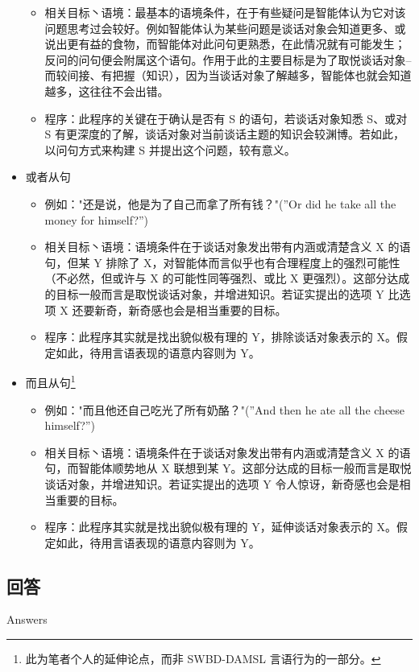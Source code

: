 \begin{itemize}
\begin{itemize}
\item 相关目标丶语境：最基本的语境条件，在于有些疑问是智能体认为它对该问题思考过会较好。例如智能体认为某些问题是谈话对象会知道更多、或说出更有益的食物，而智能体对此问句更熟悉，在此情况就有可能发生；反问的问句便会附属这个语句。作用于此的主要目标是为了取悦谈话对象– 而较间接、有把握（知识），因为当谈话对象了解越多，智能体也就会知道越多，这往往不会出错。 
\item 程序：此程序的关键在于确认是否有 S 的语句，若谈话对象知悉 S、或对 S 有更深度的了解，谈话对象对当前谈话主题的知识会较渊博。若如此，以问句方式来构建 S 并提出这个问题，较有意义。
\end{itemize}
\item 或者从句
\begin{itemize}
\item 例如："还是说，他是为了自己而拿了所有钱？"(”Or did he take all the money for himself?”)
\item 相关目标丶语境：语境条件在于谈话对象发出带有内涵或清楚含义 X 的语句，但某 Y 排除了 X，对智能体而言似乎也有合理程度上的强烈可能性（不必然，但或许与 X 的可能性同等强烈、或比 X 更强烈）。这部分达成的目标一般而言是取悦谈话对象，并增进知识。若证实提出的选项 Y 比选项 X 还要新奇，新奇感也会是相当重要的目标。 
\item 程序：此程序其实就是找出貌似极有理的 Y，排除谈话对象表示的 X。假定如此，待用言语表现的语意内容则为 Y。
\end{itemize}
\item 而且从句\footnote{此为笔者个人的延伸论点，而非 SWBD-DAMSL 言语行为的一部分。}
\begin{itemize}
\item 例如："而且他还自己吃光了所有奶酪？"(”And then he ate all the cheese himself?”)
\item 相关目标丶语境：语境条件在于谈话对象发出带有内涵或清楚含义 X 的语句，而智能体顺势地从 X 联想到某 Y。这部分达成的目标一般而言是取悦谈话对象，并增进知识。若证实提出的选项 Y 令人惊讶，新奇感也会是相当重要的目标。
\item 程序：此程序其实就是找出貌似极有理的 Y，延伸谈话对象表示的 X。假定如此，待用言语表现的语意内容则为 Y。
\end{itemize}
\end{itemize}

\subsection{回答}{Answers}

